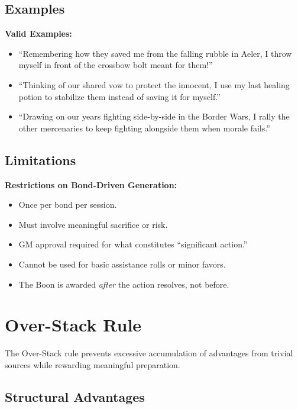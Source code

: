 \subsection{Examples}
\label{subsec:bond-examples}

\textbf{Valid Examples:}
\begin{itemize}
    \item ``Remembering how they saved me from the falling rubble in Aeler, I throw myself in front of the crossbow bolt meant for them!''
    \item ``Thinking of our shared vow to protect the innocent, I use my last healing potion to stabilize them instead of saving it for myself.''
    \item ``Drawing on our years fighting side-by-side in the Border Wars, I rally the other mercenaries to keep fighting alongside them when morale fails.''
\end{itemize}

\subsection{Limitations}
\label{subsec:bond-limitations}

\textbf{Restrictions on Bond-Driven Generation:}
\begin{itemize}
    \item Once per bond per session. 
    \item Must involve meaningful sacrifice or risk. 
    \item GM approval required for what constitutes ``significant action.'' 
    \item Cannot be used for basic assistance rolls or minor favors. 
    \item The Boon is awarded \emph{after} the action resolves, not before. 
\end{itemize}

\section{Over-Stack Rule}
\label{sec:over-stack}

The Over-Stack rule prevents excessive accumulation of advantages from trivial sources while rewarding meaningful preparation.

\subsection{Structural Advantages}
\label{subsec:structural-advantages}

